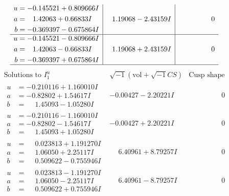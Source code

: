 \documentclass[1p]{elsarticle_modified}
\theoremstyle{definition}
\newcommand{\I}{\sqrt{-1}}
\begin{document}
$$\begin{array}{c|c|c}
\begin{aligned}
u &= -0.145521 + 0.809666 I \\
a &= \phantom{-}1.42063 + 0.66833 I \\
b &= -0.369397 - 0.675864 I\end{aligned}
 & \phantom{-}1.19068 - 2.43159 I & \phantom{-0.000000 } 0 \\ \hline\begin{aligned}
u &= -0.145521 - 0.809666 I \\
a &= \phantom{-}1.42063 - 0.66833 I \\
b &= -0.369397 + 0.675864 I\end{aligned}
 & \phantom{-}1.19068 + 2.43159 I & \phantom{-0.000000 } 0\\
 \hline 
 \end{array}$$\newpage$$\begin{array}{c|c|c}  
\text{Solutions to }I^u_{1}& \I (\text{vol} + \sqrt{-1}CS) & \text{Cusp shape}\\
 \hline 
\begin{aligned}
u &= -0.210116 + 1.160010 I \\
a &= -0.82802 + 1.54617 I \\
b &= \phantom{-}1.45093 - 1.05280 I\end{aligned}
 & -0.00427 - 2.20221 I & \phantom{-0.000000 } 0 \\ \hline\begin{aligned}
u &= -0.210116 - 1.160010 I \\
a &= -0.82802 - 1.54617 I \\
b &= \phantom{-}1.45093 + 1.05280 I\end{aligned}
 & -0.00427 + 2.20221 I & \phantom{-0.000000 } 0 \\ \hline\begin{aligned}
u &= \phantom{-}0.023813 + 1.191270 I \\
a &= \phantom{-}1.06050 + 2.25117 I \\
b &= \phantom{-}0.509622 - 0.755946 I\end{aligned}
 & \phantom{-}6.40961 + 8.79257 I & \phantom{-0.000000 } 0 \\ \hline\begin{aligned}
u &= \phantom{-}0.023813 - 1.191270 I \\
a &= \phantom{-}1.06050 - 2.25117 I \\
b &= \phantom{-}0.509622 + 0.755946 I\end{aligned}
 & \phantom{-}6.40961 - 8.79257 I & \phantom{-0.000000 } 0 \\ \hline\begin{aligned}

\end{aligned}
\end{array}$$
\end{document}
